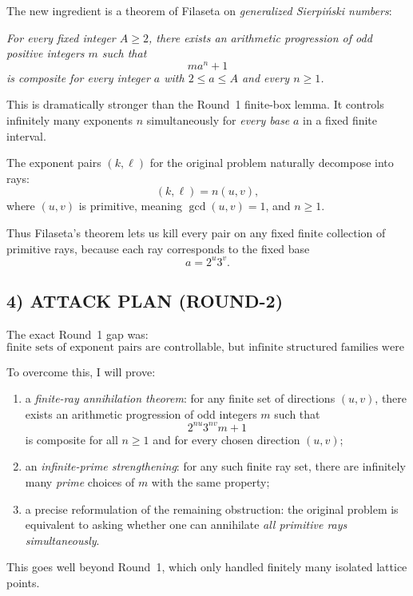 The new ingredient is a theorem of Filaseta on \emph{generalized Sierpi\'nski numbers}:

\medskip

\emph{For every fixed integer $A\ge 2$, there exists an arithmetic progression of odd positive integers $m$ such that}
\[
m a^n+1
\]
\emph{is composite for every integer $a$ with $2\le a\le A$ and every $n\ge 1$.}

\medskip

This is dramatically stronger than the Round~1 finite-box lemma. It controls infinitely many exponents $n$ simultaneously for \emph{every base} $a$ in a fixed finite interval.

The exponent pairs $(k,\ell)$ for the original problem naturally decompose into rays:
\[
(k,\ell)=n(u,v),
\]
where $(u,v)$ is primitive, meaning $\gcd(u,v)=1$, and $n\ge 1$.

Thus Filaseta's theorem lets us kill every pair on any fixed finite collection of primitive rays, because each ray corresponds to the fixed base
\[
a=2^u3^v.
\]

\subsection*{4) ATTACK PLAN (ROUND-2)}

The exact Round~1 gap was:
\[
\text{finite sets of exponent pairs are controllable, but infinite structured families were not.}
\]

To overcome this, I will prove:

\begin{enumerate}
\item a \emph{finite-ray annihilation theorem}: for any finite set of directions $(u,v)$, there exists an arithmetic progression of odd integers $m$ such that
\[
2^{nu}3^{nv}m+1
\]
is composite for all $n\ge 1$ and for every chosen direction $(u,v)$;

\item an \emph{infinite-prime strengthening}: for any such finite ray set, there are infinitely many \emph{prime} choices of $m$ with the same property;

\item a precise reformulation of the remaining obstruction: the original problem is equivalent to asking whether one can annihilate \emph{all primitive rays simultaneously}.
\end{enumerate}

This goes well beyond Round~1, which only handled finitely many isolated lattice points.

